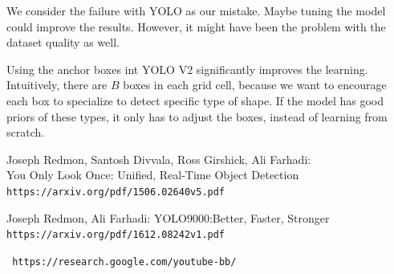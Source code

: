 \documentclass{article}
\begin{document}
We consider the failure with YOLO as our mistake. Maybe tuning the model could improve the results. However, it might have been the problem with the dataset quality as well.

Using the anchor boxes int YOLO V2 significantly improves the learning. Intuitively, there are $B$ boxes in each grid cell, because we want to encourage each box to specialize to detect specific type of shape. If the model has good priors of these types, it only has to adjust the boxes, instead of learning from scratch.

\newpage
\begin{thebibliography}{9}

Joseph Redmon, Santosh Divvala, Ross Girshick, Ali Farhadi:
\\You Only Look Once: Unified, Real-Time Object Detection
\\\texttt{https://arxiv.org/pdf/1506.02640v5.pdf}

Joseph Redmon, Ali Farhadi: YOLO9000:Better, Faster, Stronger
\\\texttt{https://arxiv.org/pdf/1612.08242v1.pdf}

\texttt{ https://research.google.com/youtube-bb/}

\end{thebibliography}
\end{document}
